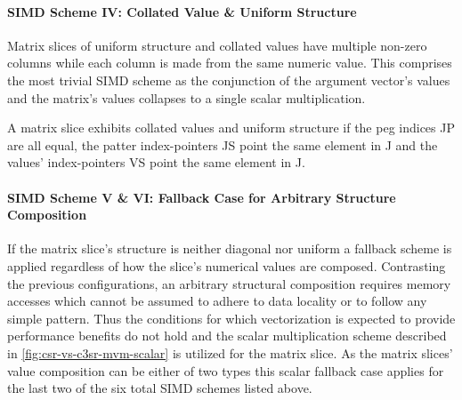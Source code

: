         \paragraph{SIMD Scheme IV: Collated Value \& Uniform Structure}

          Matrix slices of uniform structure and collated values have multiple non-zero columns while each column is
          made from the same numeric value. This comprises the most trivial SIMD scheme as the conjunction of the
          argument vector's values and the matrix's values collapses to a single scalar multiplication.

          A matrix slice exhibits collated values and uniform structure if the peg indices JP are all equal, the
          patter index-pointers JS point the same element in J and the values' index-pointers VS point the same element
          in J.

          \begin{figure}[H]
            \centering
            \captionsetup{width=0.9\columnwidth}
            
            \label{fig:simd-scheme-iv-data-layout}
          \end{figure}

        \paragraph{SIMD Scheme V \& VI: Fallback Case for Arbitrary Structure Composition}

          If the matrix slice's structure is neither diagonal nor uniform a fallback scheme is applied regardless of how
          the slice's numerical values are composed. Contrasting the previous configurations, an arbitrary structural
          composition requires memory accesses which cannot be assumed to adhere to data locality or to follow any
          simple pattern. Thus the conditions for which vectorization is expected to provide performance benefits do not
          hold and the scalar multiplication scheme described in \ref{fig:csr-vs-c3sr-mvm-scalar} is utilized for the
          matrix slice. As the matrix slices' value composition can be either of two types this scalar fallback case
          applies for the last two of the six total SIMD schemes listed above.
